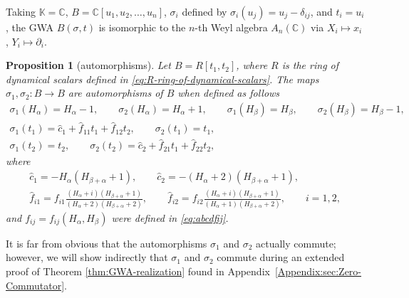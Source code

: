 \documentclass[pdftex]{sigma}
\numberwithin{equation}{section}
\newtheorem{Proposition}[Theorem]{Proposition}
 { \theoremstyle{definition}
\newtheorem{Definition}[Theorem]{Definition}
\newtheorem{Note}[Theorem]{Note}
\newtheorem{Example}[Theorem]{Example}
\newtheorem{Remark}[Theorem]{Remark} }
\begin{document}
\begin{Example}
	Taking $\mathbb{K}=\mathbb{C}$, $B=\mathbb{C}[u_1,u_2,\dots,u_n]$, $\sigma_i$ defined by $\sigma_i(u_j)=u_j-\delta_{ij}$, and $t_i=u_i$, the GWA $B(\sigma,t)$ is isomorphic to the $n$-th Weyl algebra $A_n(\mathbb{C})$ via $X_i\mapsto x_i$, $Y_i\mapsto \partial_i$.
\end{Example}

\begin{Proposition}[automorphisms]\label{Prop:Automorphisms}
	Let $B = R[t_{1},t_{2}]$, where $R$ is the ring of dynamical scalars defined in \eqref{eq:R-ring-of-dynamical-scalars}. The maps $\sigma_{1},\sigma_{2}\colon B \rightarrow B$ are automorphisms of $B$ when defined as follows
		\begin{gather*}
			\sigma_1(H_\alpha) =H_\alpha-1, \qquad \sigma_2(H_\alpha) =H_\alpha+1,\qquad
			\sigma_1(H_\beta) =H_\beta, \qquad \sigma_2(H_\beta) =H_\beta-1,\\
			\sigma_1(t_1) =\hat c_1+\hat f_{11}t_1+\hat f_{12}t_2,\qquad \sigma_2(t_1) =t_1,\\
			\sigma_1(t_2) =t_2, \qquad\sigma_2(t_2) =\hat c_2+\hat f_{21}t_1+\hat f_{22}t_2,
		\end{gather*}
	where
	\begin{gather*}
		\hat{c}_1 = -H_\alpha(H_{\beta+\alpha}+1),\qquad
		\hat{c}_2 = -(H_\alpha+2)(H_{\beta+\alpha}+1),\\
		\hat f_{i1} = f_{i1}\frac{(H_\alpha+i)(H_{\beta+\alpha}+1)}{(H_\alpha+2)(H_{\beta+\alpha}+2)},\qquad
		\hat f_{i2} = f_{i2}\frac{(H_\alpha+i)(H_{\beta+\alpha}+1)}{(H_\alpha+1)(H_{\beta+\alpha}+2)},\qquad i=1,2,
	\end{gather*}
	and $f_{ij}=f_{ij}(H_\alpha,H_\beta)$ were defined in \eqref{eq:abcdfij}.
	
\end{Proposition}

\begin{Remark}
	It is far from obvious that the automorphisms $\sigma_1$ and $\sigma_2$ actually commute; however, we will show indirectly that $\sigma_1$ and $\sigma_2$ commute during an extended proof of Theorem \ref{thm:GWA-realization} found in Appendix~\ref{Appendix:sec:Zero-Commutator}.
\end{Remark}
\end{document}
